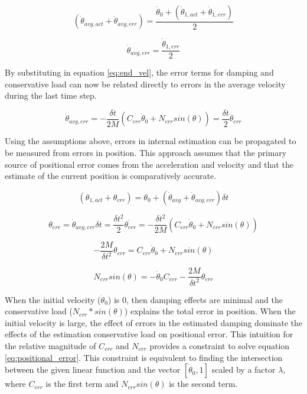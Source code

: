 \begin{equation}
(\dot{\theta}_{avg, act} + \dot{\theta}_{avg, err}) = \dfrac{\dot{\theta}_{0} + (\dot{\theta}_{1, act} + \dot{\theta}_{1, err})}{2}
\end{equation}

\begin{equation}
\dot{\theta}_{avg, err} = \dfrac{\dot{\theta}_{1, err}}{2}
\end{equation}

By substituting in equation \ref{eq:end_vel}, the error terms for damping and conservative load can now be related directly to errors in the average velocity during the last time step.

\begin{equation}
\dot{\theta}_{avg, err} = - \dfrac{\delta t}{2M}(C_{err} \dot{\theta}_{0} + N_{err} sin(\theta)) = \dfrac{\delta t}{2} \ddot{\theta}_{err}
\end{equation}


Using the assumptions above, errors in internal estimation can be propagated to be measured from errors in position. This approach assumes that the primary source of positional error comes from the acceleration and velocity and that the estimate of the current position is comparatively accurate.

\begin{equation}
(\theta_{1, act} + \theta_{err}) = \theta_{0} + (\dot{\theta}_{avg} + \dot{\theta}_{avg, err}) \delta t
\end{equation}

\begin{equation}
\theta_{err} = \dot{\theta}_{avg, err} \delta t = \dfrac{\delta t^{2}}{2} \ddot{\theta_{err}} = - \dfrac{\delta t^{2}}{2M}(C_{err} \dot{\theta}_{0} + N_{err} sin(\theta))
\end{equation}

\begin{equation}
- \dfrac{2M}{\delta t^{2}} \theta_{err} = C_{err} \dot{\theta}_{0} + N_{err} sin(\theta)
\end{equation}

\begin{equation} \label{eq:positional_error}
N_{err} sin(\theta) = 
- \dot{\theta}_{0} C_{err}
- \dfrac{2M}{\delta t^{2}} \theta_{err}
\end{equation}

When the initial velocity ($\dot{\theta}_{0}$) is 0, then damping effects are minimal and the conservative load ($N_{err} * sin(\theta)$) explains the total error in position. When the initial velocity is large, the effect of errors in the estimated damping dominate the effects of the estimation conservative load on positional error. This intuition for the relative magnitude of $C_{err}$ and $N_{err}$ provides a constraint to solve equation \ref{eq:positional_error}. This constraint is equivalent to finding the intersection between the given linear function and the vector $[\dot{\theta}_{0}, 1]$ scaled by a factor $\lambda$, where $C_{err}$ is the first term and 
$N_{err} sin(\theta)$ is the second term.


